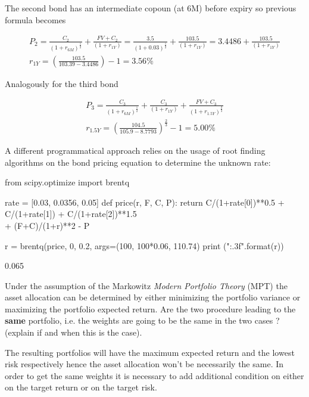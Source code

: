 \documentclass[12pt,a4paper]{exam}
\begin{document}
\begin{questions}
\begin{solution}
The second bond has an intermediate copoun (at 6M) before expiry so previous formula becomes

\begin{equation*}
  \begin{gathered}
    P_2 =  \frac{C_2}{(1+r_{6M})^{\frac{1}{2}}} + \frac{FV + C_2}{(1+r_{1Y})} = \frac{3.5}{(1+0.03)^{\frac{1}{2}}} + \frac{103.5}{(1+r_{1Y})} = 3.4486 + \frac{103.5}{(1+r_{1Y})}\\
    r_{1Y} = \left(\frac{103.5}{103.39-3.4486}\right)-1 = 3.56\%
  \end{gathered}
\end{equation*}

Analogously for the third bond

\begin{equation*}
  \begin{gathered}
    P_3 =  \frac{C_3}{(1+r_{6M})^{\frac{1}{2}}} + \frac{C_3}{(1+r_{1Y})} +  \frac{FV+C_3}{(1+r_{1.5Y})^{\frac{2}{3}}} \\
    r_{1.5Y} = \left(\frac{104.5}{105.9-8.7793}\right)^{\frac{2}{3}}-1 = 5.00\%
  \end{gathered}
\end{equation*}

A different programmatical approach relies on the usage of root finding algorithms on the bond pricing equation to determine the unknown rate:
\begin{ipython}
from scipy.optimize import brentq

rate = [0.03, 0.0356, 0.05]
def price(r, F, C, P):
    return C/(1+rate[0])**0.5 + C/(1+rate[1]) + C/(1+rate[2])**1.5 \\
        + (F+C)/(1+r)**2 - P

r = brentq(price, 0, 0.2, args=(100, 100*0.06, 110.74)
print ("{:.3f}".format(r))
\end{ipython}
\begin{ioutput}
0.065
\end{ioutput}
\end{solution}

\question
Under the assumption of the Markowitz \emph{Modern Portfolio Theory} (MPT) the asset allocation can be determined by either minimizing the portfolio variance or maximizing the portfolio expected return. Are the two procedure leading to the \textbf{same} portfolio, i.e. the weights are going to be the same in the two cases ? (explain if and when this is the case).
\fillwithlines{3cm}
\begin{solution}
The resulting portfolios will have the maximum expected return and the lowest risk respectively hence the asset allocation won't be necessarily the same. In order to get the same weights it is necessary to add additional condition on either on the target return or on the target risk.
\end{solution}


\end{questions}
\end{document}
